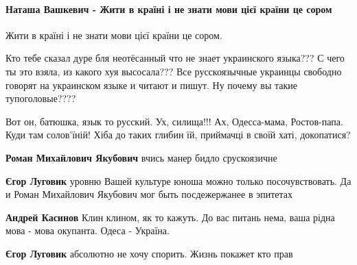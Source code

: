  
 
 
 
 
\paragraph{Наташа Вашкевич - Жити в країні і не знати мови цієї країни це сором}

\begin{itemize}

Жити в країні і не знати мови цієї країни це сором.

\begin{itemize}
Кто тебе сказал дуре бля неотёсанный что не знает украинского языка??? С чего ты это взяла, из какого хуя высосала??? Все русскоязычные украинцы свободно говорят на украинском языке и читают и пишут. Ну почему вы такие тупоголовые????

Вот он, батюшка, язык то русский. Ух, силища!!! Ах, Одесса-мама, Ростов-папа. Куди там солов'їній! Хіба до таких глибин їй, приймачці в своїй хаті, докопатися?

\textbf{Роман Михайлович Якубович} вчись манер бидло срускоязичне

\textbf{Єгор Луговик} уровню Вашей культуре юноша можно только посочувствовать.
Да и Роман Михайлович Якубович мог быть посдежержанее в эпитетах

\textbf{Андрей Касинов} Клин клином, як то кажуть. До вас питань нема, ваша рідна мова - мова окупанта. Одеса - Україна.

\textbf{Єгор Луговик} абсолютно не хочу спорить. Жизнь покажет кто прав


\end{itemize}
\end{itemize}
